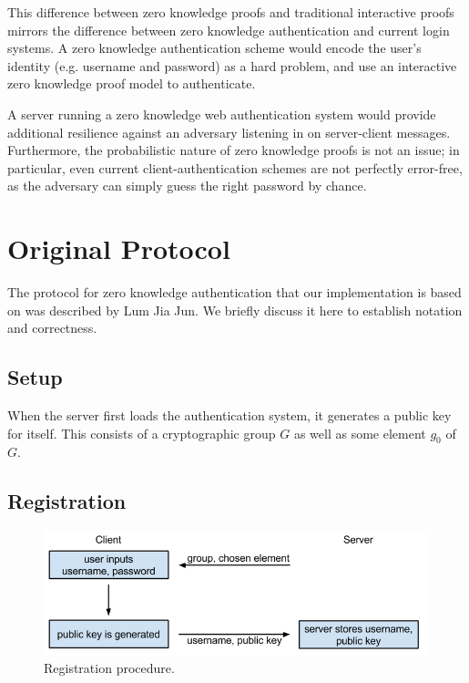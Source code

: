 \documentclass[11pt]{article}
\begin{document}
This difference between zero knowledge proofs and traditional interactive proofs mirrors the difference between zero knowledge authentication and current login systems.  A zero knowledge authentication scheme would encode the user's identity (e.g. username and password) as a hard problem, and use an interactive zero knowledge proof model to authenticate.

A server running a zero knowledge web authentication system would provide additional resilience against an adversary listening in on server-client messages\cite{Goldwasser}.  Furthermore, the probabilistic nature of zero knowledge proofs is not an issue; in particular, even current client-authentication schemes are not perfectly error-free, as the adversary can simply guess the right password by chance.

\section{Original Protocol}
The protocol for zero knowledge authentication that our implementation is based on was described by Lum Jia Jun\cite{Lum}.  We briefly discuss it here to establish notation and correctness. 

\subsection{Setup}

When the server first loads the authentication system, it generates a public key for itself.  This consists of a cryptographic group $G$ as well as some element $g_0$ of $G$\cite{Lum}.

\subsection{Registration}

\begin{figure}[h]
  \centering
\includegraphics[scale=0.65]{currentauth.png}

 \caption{Registration procedure.}
 \label{fig:registration}
\end{figure}
\end{document}
